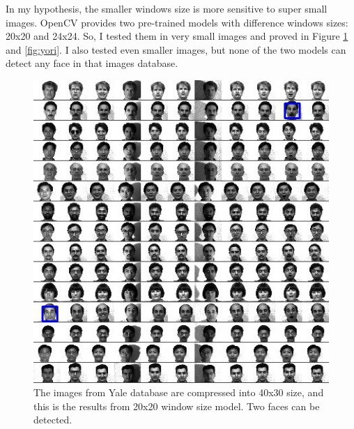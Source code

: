 \documentclass[10pt,twocolumn,letterpaper]{article}
\begin{document}
In my hypothesis, the smaller windows size is more sensitive to super small images.
OpenCV provides two pre-trained models with difference windows sizes: 20x20 and 24x24.
So, I tested them in very small images and proved in Figure \ref{fig:ysmall} and \ref{fig:yori}.
I also tested even smaller images, but none of the two models can detect any face in that images database.

\begin{figure}[t]
    \begin{center}
        \includegraphics[width=0.9\linewidth]{yaleallsmall}
    \end{center}
    \caption{The images from Yale database are compressed into 40x30 size, and this is the results from 20x20 window size model. Two faces can be detected.}
    \label{fig:ysmall}
\end{figure}
\end{document}
